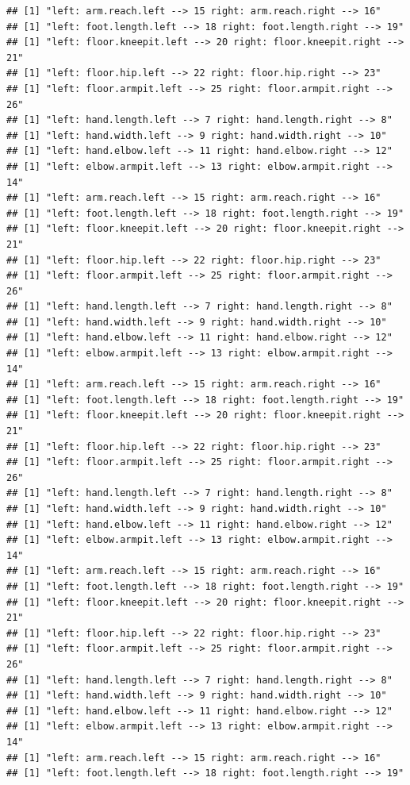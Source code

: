 \documentclass[]{article}
\begin{document}
\begin{verbatim}
## [1] "left: arm.reach.left --> 15 right: arm.reach.right --> 16"
## [1] "left: foot.length.left --> 18 right: foot.length.right --> 19"
## [1] "left: floor.kneepit.left --> 20 right: floor.kneepit.right --> 21"
## [1] "left: floor.hip.left --> 22 right: floor.hip.right --> 23"
## [1] "left: floor.armpit.left --> 25 right: floor.armpit.right --> 26"
## [1] "left: hand.length.left --> 7 right: hand.length.right --> 8"
## [1] "left: hand.width.left --> 9 right: hand.width.right --> 10"
## [1] "left: hand.elbow.left --> 11 right: hand.elbow.right --> 12"
## [1] "left: elbow.armpit.left --> 13 right: elbow.armpit.right --> 14"
## [1] "left: arm.reach.left --> 15 right: arm.reach.right --> 16"
## [1] "left: foot.length.left --> 18 right: foot.length.right --> 19"
## [1] "left: floor.kneepit.left --> 20 right: floor.kneepit.right --> 21"
## [1] "left: floor.hip.left --> 22 right: floor.hip.right --> 23"
## [1] "left: floor.armpit.left --> 25 right: floor.armpit.right --> 26"
## [1] "left: hand.length.left --> 7 right: hand.length.right --> 8"
## [1] "left: hand.width.left --> 9 right: hand.width.right --> 10"
## [1] "left: hand.elbow.left --> 11 right: hand.elbow.right --> 12"
## [1] "left: elbow.armpit.left --> 13 right: elbow.armpit.right --> 14"
## [1] "left: arm.reach.left --> 15 right: arm.reach.right --> 16"
## [1] "left: foot.length.left --> 18 right: foot.length.right --> 19"
## [1] "left: floor.kneepit.left --> 20 right: floor.kneepit.right --> 21"
## [1] "left: floor.hip.left --> 22 right: floor.hip.right --> 23"
## [1] "left: floor.armpit.left --> 25 right: floor.armpit.right --> 26"
## [1] "left: hand.length.left --> 7 right: hand.length.right --> 8"
## [1] "left: hand.width.left --> 9 right: hand.width.right --> 10"
## [1] "left: hand.elbow.left --> 11 right: hand.elbow.right --> 12"
## [1] "left: elbow.armpit.left --> 13 right: elbow.armpit.right --> 14"
## [1] "left: arm.reach.left --> 15 right: arm.reach.right --> 16"
## [1] "left: foot.length.left --> 18 right: foot.length.right --> 19"
## [1] "left: floor.kneepit.left --> 20 right: floor.kneepit.right --> 21"
## [1] "left: floor.hip.left --> 22 right: floor.hip.right --> 23"
## [1] "left: floor.armpit.left --> 25 right: floor.armpit.right --> 26"
## [1] "left: hand.length.left --> 7 right: hand.length.right --> 8"
## [1] "left: hand.width.left --> 9 right: hand.width.right --> 10"
## [1] "left: hand.elbow.left --> 11 right: hand.elbow.right --> 12"
## [1] "left: elbow.armpit.left --> 13 right: elbow.armpit.right --> 14"
## [1] "left: arm.reach.left --> 15 right: arm.reach.right --> 16"
## [1] "left: foot.length.left --> 18 right: foot.length.right --> 19"

\end{verbatim}
\end{document}

